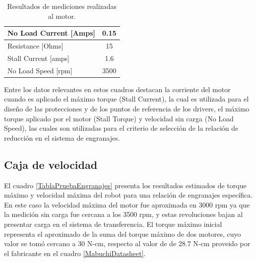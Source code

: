 \begin{table}[htbp]
	\caption{Resultados de mediciones realizadas al motor.}
	\centering
	\begin{tabular}{|l|c|}
		\hline
		No Load Current [Amps] & 0.15 \\ \hline
		Resistance [Ohms] & 15 \\ \hline
		Stall Current [amps] & 1.6 \\ \hline
		No Load Speed [rpm] & 3500 \\ \hline
	\end{tabular}
	\label{MabuchiResultados}
\end{table}




Entre los datos relevantes en estos cuadros destacan la corriente del motor cuando es aplicado el máximo torque (Stall Current), la cual es utilizada para el diseño de las protecciones y de los puntos de referencia de los drivers, el máximo torque aplicado por el motor (Stall Torque)  y velocidad sin carga (No Load Speed), las cuales son utilizadas para el criterio de selección de la relación de reducción en el sistema de engranajes.

\subsection{Caja de velocidad}


El cuadro \ref{TablaPruebaEngranajes} presenta los resultados estimados  de torque máximo y velocidad máxima del robot para una relación de engranajes específica. En este caso la velocidad máxima del motor fue aproximada en 3000 rpm ya que la medición sin carga fue cercana a los 3500 rpm, y estas revoluciones bajan al presentar carga en el sistema de transferencia. El torque máximo inicial representa el aproximado de la suma del torque máximo de dos motores, cuyo valor se tomó cercano a 30 N-cm, respecto al valor de de 28.7 N-cm proveido por el fabricante en el cuadro \ref{MabuchiDatasheet}.

